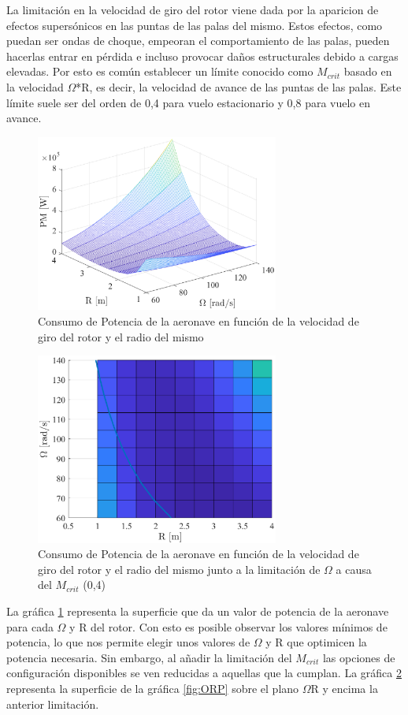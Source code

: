La limitación en la velocidad de giro del rotor viene dada por la aparicion de efectos supersónicos en las puntas de las palas del mismo. Estos efectos, como puedan ser ondas de choque, empeoran el comportamiento de las palas, pueden hacerlas entrar en pérdida e incluso provocar daños estructurales debido a cargas elevadas.
Por esto es común establecer un límite conocido como $M_{crit}$ basado en la velocidad $\Omega$*R, es decir, la velocidad de avance de las puntas de las palas. Este límite suele ser del orden de 0,4 para vuelo estacionario y 0,8 para vuelo en avance. 

\begin{figure}
	\centering
	\includegraphics[width=80mm]{graficos/3d3d}
	\caption{Consumo de Potencia de la aeronave en función de la velocidad de giro del rotor y el radio del mismo}
	\label{ORP}
\end{figure}
\begin{figure}
	\centering
	\includegraphics[width=80mm]{graficos/3d2d}
	\caption{Consumo de Potencia de la aeronave en función de la velocidad de giro del rotor y el radio del mismo junto a la limitación de $\Omega$ a causa del $M_{crit}$ (0,4)}
	\label{ORPM}
\end{figure}

La gráfica \ref{ORP} representa la superficie que da un valor de potencia de la aeronave para cada $\Omega$ y R del rotor. Con esto es posible observar los valores mínimos de potencia, lo que nos permite elegir unos valores de $\Omega$ y R que optimicen la potencia necesaria.
Sin embargo, al añadir la limitación del $M_{crit}$ las opciones de configuración disponibles se ven reducidas a aquellas que la cumplan. La gráfica \ref{ORPM} representa la superficie de la gráfica \ref{fig:ORP} sobre el plano $\Omega$R y encima la anterior limitación.